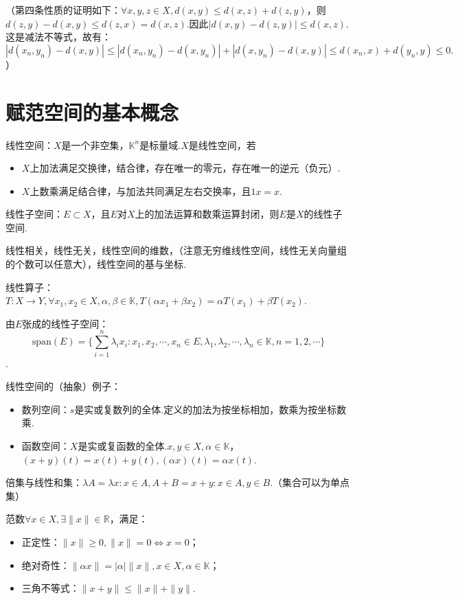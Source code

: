 \documentclass[bwprint, withoutpreface]{cumcmthesis}
\begin{document}
（第四条性质的证明如下：$\forall x, y, z \in X, d(x, y) \leqslant d(x, z) + d(z, y)$，则$d(z, y) - d(x, y) \leqslant d(z, x) = d(x, z)$.因此$|d(x, y) - d(z, y)| \leqslant d(x, z)$.这是减法不等式，故有：$|d(x_n, y_n) - d(x, y)| \leqslant |d(x_n, y_n) - d(x, y_n)| + |d(x, y_n) - d(x, y)| \leqslant d(x_n, x) + d(y_n, y) \leqslant 0.$）

\section{赋范空间的基本概念}
线性空间：$X$是一个非空集，$\mathbb{K}^n$是标量域.$X$是线性空间，若
\begin{itemize}[itemindent=2em]
	\item $X$上加法满足交换律，结合律，存在唯一的零元，存在唯一的逆元（负元）.
	\item $X$上数乘满足结合律，与加法共同满足左右交换率，且$1x = x$.
\end{itemize}

线性子空间：$E \subset X$，且$E$对$X$上的加法运算和数乘运算封闭，则$E$是$X$的线性子空间.

线性相关，线性无关，线性空间的维数，（注意无穷维线性空间，线性无关向量组的个数可以任意大），线性空间的基与坐标.

线性算子：$T:X \to Y, \forall x_1, x_2 \in X, \alpha, \beta \in \mathbb{K}, T(\alpha x_1 + \beta x_2) = \alpha T(x_1) + \beta T(x_2)$.

由$E$张成的线性子空间：\[\mathrm{span}(E) = \{\sum_{i = 1}^{n}{\lambda_i x_i: x_1, x_2, \cdots, x_n \in E, \lambda_1, \lambda_2, \cdots, \lambda_n \in \mathbb{K}, n = 1, 2, \cdots}\}\].

线性空间的（抽象）例子：
\begin{itemize}[itemindent=2em]
	\item 数列空间：$s$是实或复数列的全体.定义的加法为按坐标相加，数乘为按坐标数乘.
	\item 函数空间：$X$是实或复函数的全体.$x, y \in X, \alpha \in \mathbb{K}$，$(x + y)(t) = x(t) + y(t), (\alpha x)(t) = \alpha x(t)$.
\end{itemize}

倍集与线性和集：$\lambda A = {\lambda x: x \in A}, A + B = {x + y:x \in A, y \in B}$.（集合可以为单点集）

范数$\forall x \in X, \exists \|x\| \in \mathbb{R}$，满足：
\begin{itemize}[itemindent=2em]
	\item 正定性：$\|x\| \geqslant 0, \| x \| = 0 \iff x = 0$；
	\item 绝对奇性：$\| \alpha x \| = |\alpha| \| x \|, x \in X, \alpha \in \mathbb{K}$；
	\item 三角不等式：$\| x + y \| \leqslant \| x \| + \| y \|$.
\end{itemize}
\end{document}
